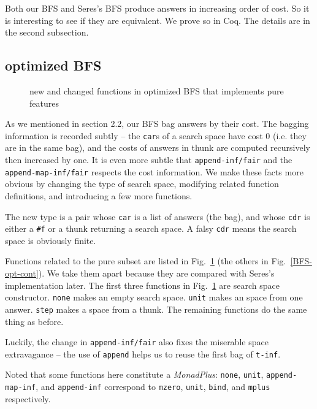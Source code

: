 \documentclass[format=acmlarge, review=true, authordraft=true]{acmart}
\begin{document}
Both our BFS and Seres's BFS \citep{seres1999algebra} produce answers in 
increasing order of cost. So it is interesting to see if they are equivalent. 
We prove so in Coq. The details are in the second subsection.

\subsection{optimized BFS}

\begin{figure}
		
	\caption{new and changed functions in optimized BFS that implements pure 
	features}
	\label{BFS-opt}
\end{figure}

As we mentioned in section 2.2, our BFS bag answers by their cost. The bagging 
information is recorded subtly -- the \texttt{car}s of a search space have cost 
0 (i.e. they are in the same bag), and the costs of answers in thunk are 
computed recursively then increased by one. It is even more subtle that
\texttt{append-inf/fair} and the \texttt{append-map-inf/fair} respects the cost 
information. We make these facts more obvious by changing the type of search 
space, modifying related function definitions, and introducing a few more 
functions.

The new type is a pair whose \texttt{car} is a list of answers (the bag), and 
whose \texttt{cdr} is either a \texttt{\#{}f} or a thunk returning a search 
space. A falsy \texttt{cdr} means the search space is obviously finite. 

Functions related to the pure subset are listed in Fig.~\ref{BFS-opt} (the 
others in Fig.~\ref{BFS-opt-cont}). We take them apart because they are 
compared with Seres's implementation later. The first three functions in 
Fig.~\ref{BFS-opt} are search space constructor. \texttt{none} makes an empty 
search space. \texttt{unit} makes an space from one answer. \texttt{step} makes 
a space from a thunk. The remaining functions do the same thing as before. 

Luckily, the change in \texttt{append-inf/fair} also fixes the miserable space 
extravagance -- the use of \texttt{append} helps us to reuse the first bag of 
\texttt{t-inf}.

Noted that some functions here constitute a \emph{MonadPlus}: 
\texttt{none}, \texttt{unit}, \texttt{append-map-inf}, and \texttt{append-inf} 
correspond to \texttt{mzero}, \texttt{unit}, \texttt{bind}, and \texttt{mplus} 
respectively.
\end{document}
